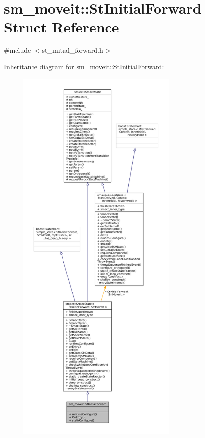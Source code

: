\hypertarget{structsm__moveit_1_1StInitialForward}{}\section{sm\+\_\+moveit\+:\+:St\+Initial\+Forward Struct Reference}
\label{structsm__moveit_1_1StInitialForward}


{\ttfamily \#include $<$st\+\_\+initial\+\_\+forward.\+h$>$}



Inheritance diagram for sm\+\_\+moveit\+:\+:St\+Initial\+Forward\+:
\nopagebreak
\begin{figure}[H]
\begin{center}
\leavevmode
\includegraphics[height=550pt]{structsm__moveit_1_1StInitialForward__inherit__graph}
\end{center}
\end{figure}


